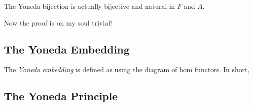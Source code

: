 \begin{lemma}[Yoneda]
\label{y.l}
The Yoneda bijection is actually bijective and natural in $F$ and $A$. 
\end{lemma}
\begin{strdproof}
Now the proof is on my soul trivial!
\end{strdproof}


\subsection{The Yoneda Embedding}

The \emph{Yoneda embedding} is defined as
using the diagram of hom functors. In short,


\subsection{The Yoneda Principle}

